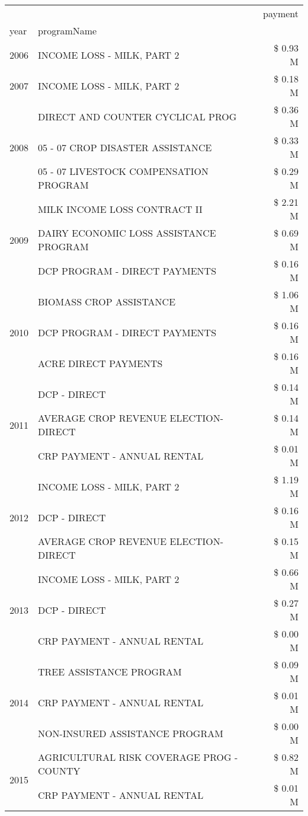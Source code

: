 \begin{tabular}{llr}
\toprule
 &  & payment \\
year & programName &  \\
\midrule
2006 & INCOME LOSS - MILK, PART 2 & \$ 0.93 M \\
\cline{1-3}
2007 & INCOME LOSS - MILK, PART 2 & \$ 0.18 M \\
\cline{1-3}
\multirow[t]{3}{*}{2008} & DIRECT AND COUNTER CYCLICAL PROG & \$ 0.36 M \\
 & 05 - 07 CROP DISASTER ASSISTANCE & \$ 0.33 M \\
 & 05 - 07 LIVESTOCK COMPENSATION PROGRAM & \$ 0.29 M \\
\cline{1-3}
\multirow[t]{3}{*}{2009} & MILK INCOME LOSS CONTRACT II & \$ 2.21 M \\
 & DAIRY ECONOMIC LOSS ASSISTANCE PROGRAM & \$ 0.69 M \\
 & DCP PROGRAM - DIRECT PAYMENTS & \$ 0.16 M \\
\cline{1-3}
\multirow[t]{3}{*}{2010} & BIOMASS CROP ASSISTANCE & \$ 1.06 M \\
 & DCP PROGRAM - DIRECT PAYMENTS & \$ 0.16 M \\
 & ACRE DIRECT PAYMENTS & \$ 0.16 M \\
\cline{1-3}
\multirow[t]{3}{*}{2011} & DCP - DIRECT & \$ 0.14 M \\
 & AVERAGE CROP REVENUE ELECTION-DIRECT & \$ 0.14 M \\
 & CRP PAYMENT - ANNUAL RENTAL & \$ 0.01 M \\
\cline{1-3}
\multirow[t]{3}{*}{2012} & INCOME LOSS - MILK, PART 2 & \$ 1.19 M \\
 & DCP - DIRECT & \$ 0.16 M \\
 & AVERAGE CROP REVENUE ELECTION-DIRECT & \$ 0.15 M \\
\cline{1-3}
\multirow[t]{3}{*}{2013} & INCOME LOSS - MILK, PART 2 & \$ 0.66 M \\
 & DCP - DIRECT & \$ 0.27 M \\
 & CRP PAYMENT - ANNUAL RENTAL & \$ 0.00 M \\
\cline{1-3}
\multirow[t]{3}{*}{2014} & TREE ASSISTANCE PROGRAM & \$ 0.09 M \\
 & CRP PAYMENT - ANNUAL RENTAL & \$ 0.01 M \\
 & NON-INSURED ASSISTANCE PROGRAM & \$ 0.00 M \\
\cline{1-3}
\multirow[t]{3}{*}{2015} & AGRICULTURAL RISK COVERAGE PROG - COUNTY & \$ 0.82 M \\
 & CRP PAYMENT - ANNUAL RENTAL & \$ 0.01 M \\

\end{tabular}
